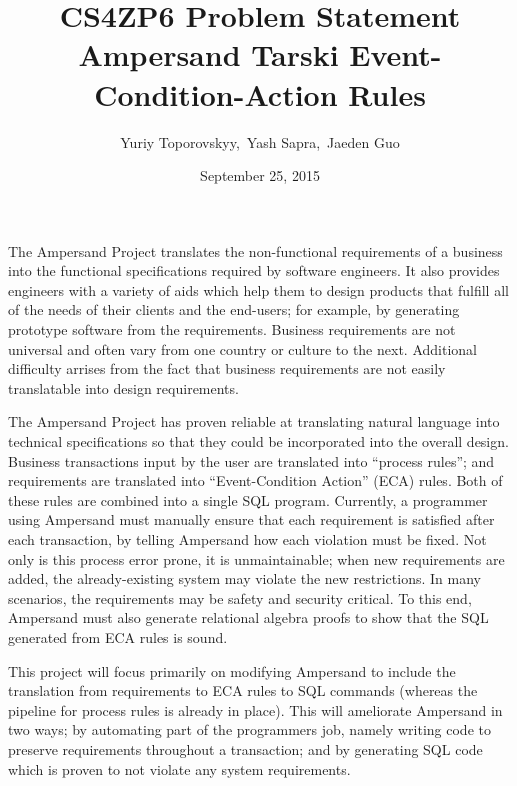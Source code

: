 \documentclass[12pt]{article}
\begin{document}
\title{CS4ZP6 Problem Statement \\ Ampersand Tarski Event-Condition-Action Rules } 
\author{Yuriy Toporovskyy,\ Yash Sapra,\ Jaeden Guo}
\date{September 25, 2015}
\thispagestyle{empty}
\maketitle


The Ampersand Project translates the non-functional requirements of a
business into the functional specifications required by software engineers. It
also provides engineers with a variety of aids which help them to design
products that fulfill all of the needs of their clients and the end-users; for
example, by generating prototype software from the requirements.
Business requirements are not universal and often vary from one country or
culture to the next. Additional difficulty arrises from the fact that business
requirements are not easily translatable into design requirements. 

The Ampersand Project has proven reliable at translating natural
language into technical specifications so that they could be incorporated into
the overall design. Business transactions input by the user are translated into
``process rules''; and requirements are translated into ``Event-Condition
Action'' (ECA) rules. Both of these rules are combined into a single SQL
program. Currently, a programmer using Ampersand must manually ensure that each
requirement is satisfied after each transaction, by telling Ampersand how each
violation must be fixed. Not only is this process error prone, it is
unmaintainable; when new requirements are added, the already-existing system may
violate the new restrictions. In many scenarios, the requirements may be safety
and security critical. To this end, Ampersand must also generate relational
algebra proofs to show that the SQL generated from ECA rules is sound. 

This project will focus primarily on modifying Ampersand to include the
translation from requirements to ECA rules to SQL commands (whereas the pipeline
for process rules is already in place). This will ameliorate Ampersand in two
ways; by automating part of the programmers job, namely writing code to preserve
requirements throughout a transaction; and by generating SQL code which is
proven to not violate any system requirements. 
\end{document}
